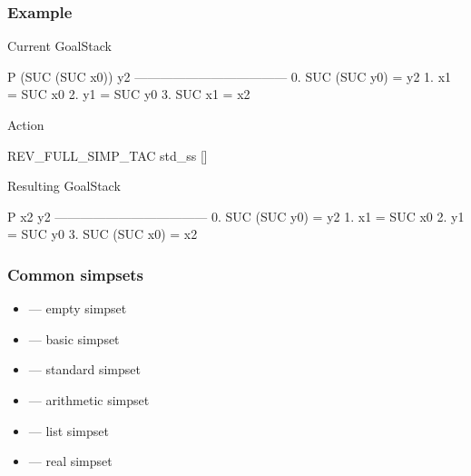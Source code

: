 \begin{frame}[fragile]
\frametitle{ Example}

\begin{exampleblock}{Current GoalStack}
\begin{semiverbatim}\scriptsize
P (SUC (SUC x0)) y2
------------------------------------
  0.  SUC (SUC y0) = y2
  1.  x1 = SUC x0
  2.  y1 = SUC y0
  3.  SUC x1 = x2
\end{semiverbatim}
\end{exampleblock}

\begin{exampleblock}{Action}
\begin{semiverbatim}\scriptsize
REV_FULL_SIMP_TAC std_ss [] 
\end{semiverbatim}
\end{exampleblock}
 
\begin{exampleblock}{Resulting GoalStack}
\begin{semiverbatim}\scriptsize
P x2 y2
------------------------------------
  0.  SUC (SUC y0) = y2
  1.  x1 = SUC x0
  2.  y1 = SUC y0
  3.  SUC (SUC x0) = x2
\end{semiverbatim}
\end{exampleblock}
\end{frame}



\begin{frame}[fragile]
\frametitle{Common simpsets}

\begin{itemize}
\item {} --- empty simpset
\item {} --- basic simpset
\item {} --- standard simpset
\item {} --- arithmetic simpset
\item {} --- list simpset
\item {} --- real simpset
\end{itemize}
\end{frame}

